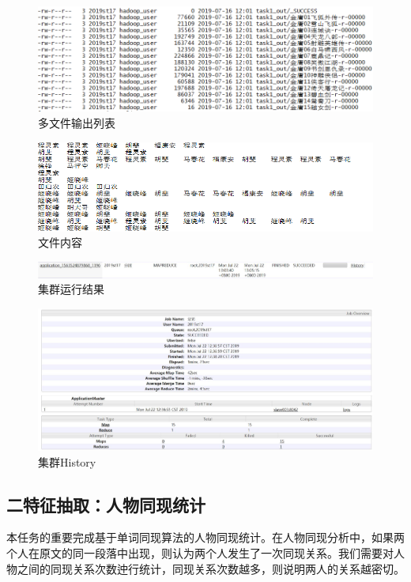 \documentclass{ctexart}
\begin{document}
	\begin{figure}[H]
		\centering
		\includegraphics[width=0.8\linewidth]{pic/task1/filestyle}
		\caption{多文件输出列表}
	\end{figure}
	\begin{figure}[H]
	\centering
	\includegraphics[width=0.8\linewidth]{pic/task1/filecontent}
	\caption{文件内容}
	\end{figure}
	\begin{figure}[H]
		\centering
		\includegraphics[width=0.8\linewidth]{pic/webui/task1}
		\caption{集群运行结果}
	\end{figure}
	\begin{figure}[H]
		\centering
		\includegraphics[width=0.8\linewidth]{pic/webui/task1_job}
		\caption{集群History}
	\end{figure}
	
	

	\subsection{二\quad 特征抽取：人物同现统计}
	\par 本任务的重要完成基于单词同现算法的人物同现统计。在人物同现分析中，如果两个人在原文的同一段落中出现，则认为两个人发生了一次同现关系。我们需要对人物之间的同现关系次数迚行统计，同现关系次数越多，则说明两人的关系越密切。
\end{document}
